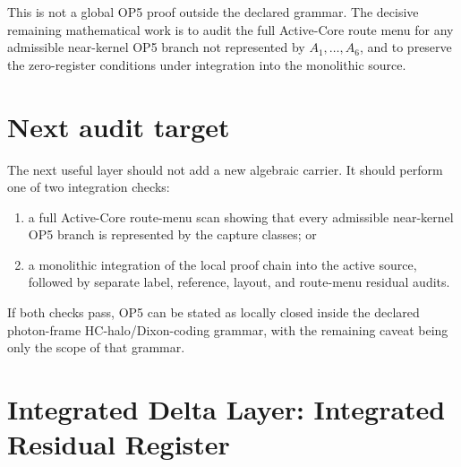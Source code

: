 \begin{remark}
This is not a global OP5 proof outside the declared grammar. The decisive remaining mathematical work is to audit the full Active-Core route menu for any admissible near-kernel OP5 branch not represented by \(A_1,\ldots,A_6\), and to preserve the zero-register conditions under integration into the monolithic source.
\end{remark}

\section{Next audit target}

The next useful layer should not add a new algebraic carrier. It should perform one of two integration checks:
\begin{enumerate}[label=(\alph*)]
\item a full Active-Core route-menu scan showing that every admissible near-kernel OP5 branch is represented by the capture classes; or
\item a monolithic integration of the local proof chain into the active source, followed by separate label, reference, layout, and route-menu residual audits.
\end{enumerate}
If both checks pass, OP5 can be stated as locally closed inside the declared photon-frame HC-halo/Dixon-coding grammar, with the remaining caveat being only the scope of that grammar.



\clearpage
\section*{Integrated Delta Layer: Integrated Residual Register}
\providecommand{\OPfive}{}
\renewcommand{\OPfive}{\mathrm{OP5}}
\providecommand{\HC}{}
\renewcommand{\HC}{\mathrm{HC}}
\providecommand{\MM}{}
\renewcommand{\MM}{\mathrm{MM}}
\providecommand{\Dix}{}
\renewcommand{\Dix}{\mathrm{Dix}}
\providecommand{\Ad}{}
\renewcommand{\Ad}{\mathsf{adm}}
\providecommand{\Block}{}
\renewcommand{\Block}{\mathsf{block}}
\providecommand{\Abs}{}
\renewcommand{\Abs}{\mathsf{abs}}
\providecommand{\Route}{}
\renewcommand{\Route}{\mathsf{route}}
\providecommand{\Res}{}
\renewcommand{\Res}{\mathsf{res}}
\providecommand{\Leak}{}
\renewcommand{\Leak}{\mathsf{leak}}
\providecommand{\Debt}{}
\renewcommand{\Debt}{\mathsf{debt}}
\providecommand{\HaloOp}{}
\renewcommand{\HaloOp}{\mathsf{Halo}}
\providecommand{\ExitOp}{}
\renewcommand{\ExitOp}{\mathsf{Exit}}
\providecommand{\NearK}{}
\renewcommand{\NearK}{\mathrm{near}\,K}



